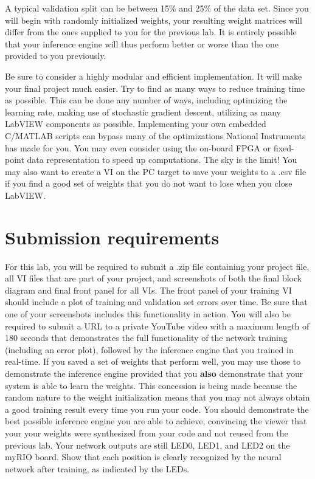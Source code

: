 \documentclass{article}
\begin{document}
A typical validation split can be between 15\% and 25\% of the data set.  Since you will begin with randomly initialized weights, your resulting weight matrices will differ from the ones supplied to you for the previous lab. It is entirely possible that your inference engine will thus perform better or worse than the one provided to you previously.

Be sure to consider a highly modular and efficient implementation. It will make your final project much easier. Try to find as many ways to reduce training time as possible. This can be done any number of ways, including optimizing the learning rate, making use of stochastic gradient descent, utilizing as many LabVIEW components as possible. Implementing your own embedded C/MATLAB scripts can bypass many of the optimizations National Instruments has made for you. You may even consider using the on-board FPGA or fixed-point data representation to speed up computations. The sky is the limit! You may also want to create a VI on the PC target to save your weights to a .csv file if you find a good set of weights that you do not want to lose when you close LabVIEW.

\section{Submission requirements}

For this lab, you will be required to submit a .zip file containing your project file, all VI files that are part of your project, and screenshots of both the final block diagram and final front panel for all VIs. The front panel of your training VI should include a plot of training and validation set errors over time. Be sure that one of your screenshots includes this functionality in action. You will also be required to submit a URL to a private YouTube video with a maximum length of 180 seconds that demonstrates the full functionality of the network training (including an error plot), followed by the inference engine that you trained in real-time. If you saved a set of weights that perform well, you may use those to demonstrate the inference engine provided that you {\bf also} demonstrate that your system is able to learn the weights. This concession is being made because the random nature to the weight initialization means that you may not always obtain a good training result every time you run your code. You should demonstrate the best possible inference engine you are able to achieve, convincing the viewer that your your weights were synthesized from your code and not reused from the previous lab. Your network outputs are still LED0, LED1, and LED2 on the myRIO board. Show that each position is clearly recognized by the neural network after training, as indicated by the LEDs.


\printbibliography

\onecolumn
\end{document}
